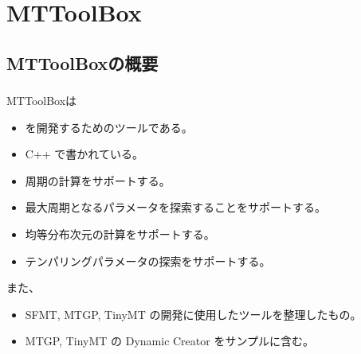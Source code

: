 \documentclass[cjk, dvips, handout, trans, xcolor=dvipsnames]{beamer}
\def\bx{{{\mathbf x}}}
\begin{document}

\section{MTToolBox}
\subsection{MTToolBoxの概要}
\begin{frame}[t]
  \frametitle{\insertsubsection}
  MTToolBoxは
  \begin{itemize}
  \item \FLPRNG を開発するためのツールである。
  \item C++ で書かれている。
  \item 周期の計算をサポートする。
  \item 最大周期となるパラメータを探索することをサポートする。
  \item 均等分布次元の計算をサポートする。
  \item テンパリングパラメータの探索をサポートする。
  \end{itemize}

  \pause
  また、
  \begin{itemize}
  \item SFMT, MTGP, TinyMT の開発に使用したツールを整理したもの。
  \item MTGP, TinyMT の Dynamic Creator をサンプルに含む。
  \end{itemize}
\end{frame}
\end{document}
